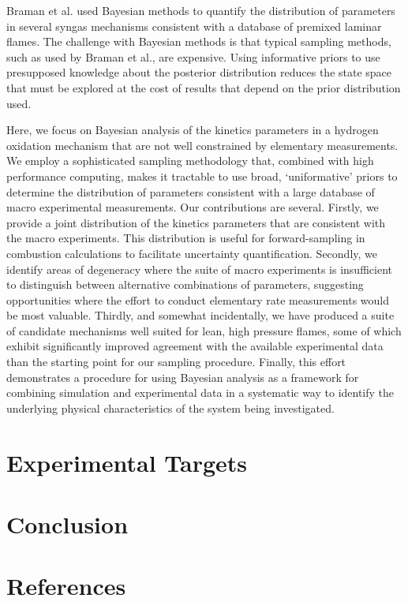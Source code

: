 \documentclass[preprint,3p,times,twocolumn]{elsarticle}
\begin{document}
Braman et al. \cite{BramanOR13} used Bayesian methods to quantify the
distribution of parameters in several syngas mechanisms consistent with
a database of premixed laminar flames. The challenge with Bayesian
methods is that typical sampling methods, such as used by Braman et al.,
are expensive. Using informative priors to use presupposed knowledge
about the posterior distribution reduces the state space that must be
explored at the cost of results that depend on the prior distribution used. 

Here, we focus on Bayesian analysis of the kinetics parameters in a
hydrogen oxidation mechanism that are not well constrained by elementary
measurements. We employ a sophisticated sampling methodology that,
combined with high performance computing, makes it tractable to use
broad, `uniformative' priors to determine the distribution of parameters
consistent with a large database of macro experimental measurements. Our
contributions are several. Firstly, we provide a joint distribution of
the kinetics parameters that are consistent with the macro experiments.
This distribution is useful for forward-sampling in combustion
calculations to facilitate uncertainty quantification. Secondly, we
identify areas of degeneracy where the suite of macro experiments is
insufficient to distinguish between alternative combinations of
parameters, suggesting opportunities where the effort to conduct
elementary rate measurements would be most valuable. Thirdly, and
somewhat incidentally, we have produced a suite of candidate mechanisms
well suited for lean, high pressure flames, some of which exhibit
significantly improved agreement with the available experimental data
than the starting point for our sampling procedure. Finally, this effort
demonstrates a procedure for using Bayesian analysis as a framework for
combining simulation and experimental data in a systematic way to
identify the underlying physical characteristics of the system being
investigated. 


\section{Experimental Targets}
%

\section{Conclusion}


\section{References}
    

\end{document}
